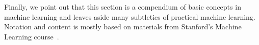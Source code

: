 Finally, we point out that this section is a compendium of basic concepts in machine learning and leaves aside many subtleties of practical machine learning. Notation and content is mostly based on materials from Stanford's Machine Learning course~\cite{Ng2014}.

